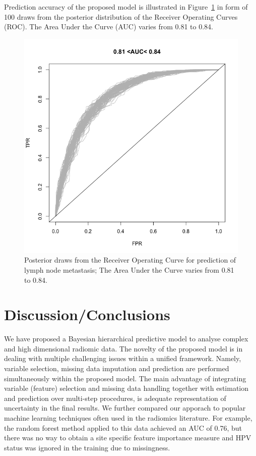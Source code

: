\documentclass[10pt]{article}
\begin{document}
Prediction accuracy of the proposed model is illustrated in Figure~\ref{fig2} in form of 100 draws from the posterior distribution of the Receiver Operating Curves (ROC). The Area Under the Curve (AUC) varies from 0.81 to 0.84.



\begin{figure}[htbp]
	\begin{center}
		\centerline{\includegraphics[width=0.9\columnwidth]{ROC.png}}
		\caption{Posterior draws from the Receiver Operating Curve for prediction of lymph node metastasis; The Area Under the Curve varies from 0.81 to 0.84.}
		\label{fig2}
	\end{center}
\end{figure}



\section{Discussion/Conclusions}

We have proposed a Bayesian hierarchical predictive model to analyse complex and high dimensional radiomic data. The novelty of the proposed model is in dealing with multiple challenging issues within a unified framework.  Namely, variable selection, missing data imputation and prediction are performed simultaneously within the proposed model. The main advantage of integrating variable (feature) selection and missing data handling together with estimation and prediction over multi-step procedures, is adequate representation of uncertainty in the final results. We further compared our apporach to popular machine learning techniques often used in the radiomics literature. For example, the random forest method applied to this data achieved an AUC of 0.76, but there was no way to obtain a site specific feature importance measure and HPV status was ignored in the training due to missingness. 




\end{document}
